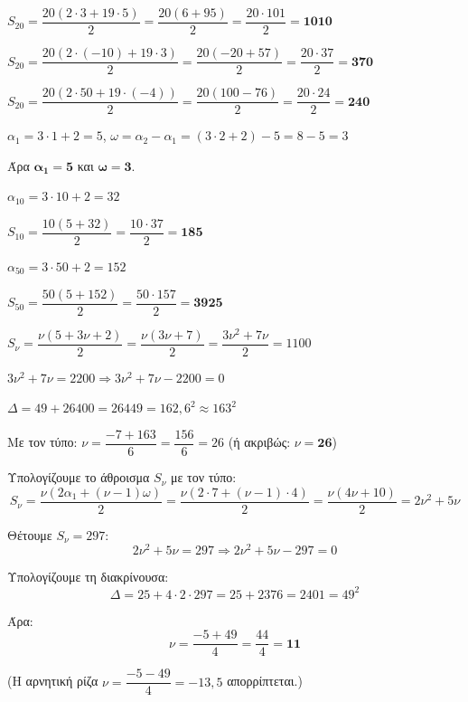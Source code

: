 \documentclass[11pt,a4paper,modern]{FFExercises}
\begin{document}
\lysh[18]
\begin{alist}
\item $S_{20}=\dfrac{20(2\cdot 3+19\cdot 5)}{2}=\dfrac{20(6+95)}{2}=\dfrac{20\cdot 101}{2}=\boldsymbol{1010}$

\item $S_{20}=\dfrac{20(2\cdot(-10)+19\cdot 3)}{2}=\dfrac{20(-20+57)}{2}=\dfrac{20\cdot 37}{2}=\boldsymbol{370}$

\item $S_{20}=\dfrac{20(2\cdot 50+19\cdot(-4))}{2}=\dfrac{20(100-76)}{2}=\dfrac{20\cdot 24}{2}=\boldsymbol{240}$
\end{alist}

\lysh[19]
\begin{alist}
\item $\alpha_1=3\cdot 1+2=5$, \quad $\omega=\alpha_2-\alpha_1=(3\cdot 2+2)-5=8-5=3$

Άρα $\boldsymbol{\alpha_1=5}$ και $\boldsymbol{\omega=3}$.

\item $\alpha_{10}=3\cdot 10+2=32$

$S_{10}=\dfrac{10(5+32)}{2}=\dfrac{10\cdot 37}{2}=\boldsymbol{185}$

\item $\alpha_{50}=3\cdot 50+2=152$

$S_{50}=\dfrac{50(5+152)}{2}=\dfrac{50\cdot 157}{2}=\boldsymbol{3925}$

\item $S_{\nu}=\dfrac{\nu(5+3\nu+2)}{2}=\dfrac{\nu(3\nu+7)}{2}=\dfrac{3\nu^2+7\nu}{2}=1100$

$3\nu^2+7\nu=2200 \Rightarrow 3\nu^2+7\nu-2200=0$

$\varDelta=49+26400=26449=162{,}6^2\approx 163^2$

Με τον τύπο: $\nu=\dfrac{-7+163}{6}=\dfrac{156}{6}=26$ \quad (ή ακριβώς: $\nu=\boldsymbol{26}$)
\end{alist}

\lysh[20]
Υπολογίζουμε το άθροισμα $S_{\nu}$ με τον τύπο:
$$S_{\nu}=\dfrac{\nu(2\alpha_1+(\nu-1)\omega)}{2}=\dfrac{\nu(2\cdot 7+(\nu-1)\cdot 4)}{2}=\dfrac{\nu(4\nu+10)}{2}=2\nu^2+5\nu$$

Θέτουμε $S_{\nu}=297$:
$$2\nu^2+5\nu=297 \Rightarrow 2\nu^2+5\nu-297=0$$

Υπολογίζουμε τη διακρίνουσα:
$$\varDelta=25+4\cdot 2\cdot 297=25+2376=2401=49^2$$

Άρα:
$$\nu=\dfrac{-5+49}{4}=\dfrac{44}{4}=\boldsymbol{11}$$

(Η αρνητική ρίζα $\nu=\dfrac{-5-49}{4}=-13{,}5$ απορρίπτεται.)
\end{document}
